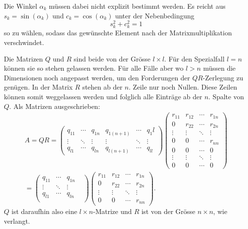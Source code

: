 Die Winkel $\alpha_k$ müssen dabei nicht explizit bestimmt werden.
Es reicht aus $s_k = \sin(\alpha_k)$ und $c_k=\cos(\alpha_k)$ unter der Nebenbedingung
\begin{equation*}
s_k^2+c_k^2 = 1
\end{equation*}
so zu wählen, sodass das gewünschte Element nach der Matrixmultiplikation verschwindet.

Die Matrizen $Q$ und $R$ sind beide von der Grösse $l\times l$.
Für den Spezialfall $l=n$ können sie so stehen gelassen werden.
Für alle Fälle aber wo $l>n$ müssen die Dimensionen noch angepasst werden, um den Forderungen der $QR$-Zerlegung zu genügen.
In der Matrix $R$ stehen ab der $n.$ Zeile nur noch Nullen.
Diese Zeilen können somit weggelassen werden und folglich alle Einträge ab der $n.$ Spalte von $Q$.
Als Matrizen ausgeschrieben:
\begin{multline*}
A=QR=
\begin{pmatrix}
q_{11}&\cdots&q_{1n}&q_{1(n+1)}&\cdots&q_1l\\
\vdots&\ddots&\vdots&\vdots    &\ddots&\vdots\\
q_{l1}&\cdots&q_{ln}&q_{l(n+1)}&\cdots&q_{ll}
\end{pmatrix}
\begin{pmatrix}
r_{11}&r_{12}&\cdots&r_{1n}\\
0     &r_{22}&\cdots&r_{2n}\\
\vdots&\vdots&\ddots&\vdots\\
0     &0     &\cdots&r_{nn}\\
0     &0     &\cdots&0\\
\vdots&\vdots&\ddots&\vdots\\
0     &0     &\cdots&0
\end{pmatrix}\\=
\begin{pmatrix}
q_{11}&\cdots&q_{1n}&\\
\vdots&\ddots&\vdots&\\
q_{l1}&\cdots&q_{ln}\\
\end{pmatrix}
\begin{pmatrix}
r_{11}&r_{12}&\cdots&r_{1n}\\
0     &r_{22}&\cdots&r_{2n}\\
\vdots&\vdots&\ddots&\vdots\\
0     &0     &\cdots&r_{nn}
\end{pmatrix}.
\end{multline*}
$Q$ ist daraufhin also eine $l\times n$-Matrize und $R$ ist von der Grösse $n\times n$, wie verlangt.

